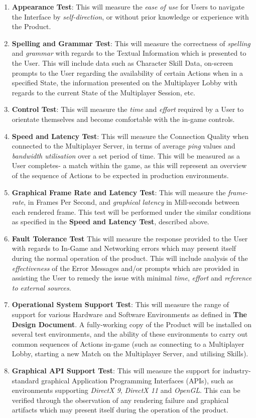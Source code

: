 \documentclass{article}
\begin{document}
\begin{enumerate}
    \item \textbf{Appearance Test}:  This will measure the \emph{ease of use} for Users to navigate the Interface by \emph{self-direction}, or without prior knowledge or experience with the Product.
    \item \textbf{Spelling and Grammar Test}:  This will measure the correctness of \emph{spelling} and \emph{grammar} with regards to the Textual Information which is presented to the User. This will include data such as Character Skill Data, on-screen prompts to the User regarding the availability of certain Actions when in a specified State, the information presented on the Multiplayer Lobby with regards to the current State of the Multiplayer Session, etc.
    \item \textbf{Control Test}: This will measure the \emph{time} and \emph{effort} required by a User to orientate themselves and become comfortable with the in-game controls.
    \item \textbf{Speed and Latency Test}: This will measure the Connection Quality when connected to the Multiplayer Server, in terms of average \emph{ping} values and \emph{bandwidth utilisation} over a set period of time. This will be measured as a User completes- a match within the game, as this will represent an overview of the sequence of Actions to be expected in production environments.
    \item \textbf{Graphical Frame Rate and Latency Test}: This will measure the \emph{frame-rate}, in Frames Per Second, and \emph{graphical latency} in Mill-seconds between each rendered frame. This test will be performed under the similar conditions as specified in the \textbf{Speed and Latency Test}, described above.
    \item \textbf{Fault Tolerance Test} This will measure the response provided to the User with regards to In-Game and Networking errors which may present itself during the normal operation of the product. This will include analysis of the \emph{effectiveness} of the Error Messages and/or prompts which are provided in assisting the User to remedy the issue with minimal \emph{time}, \emph{effort} and \emph{reference to external sources}.
    \item \textbf{Operational System Support Test}:  This will measure the range of support for various Hardware and Software Environments as defined in \textbf{The Design Document}. A fully-working copy of the Product will be installed on several test environments, and the ability of these environments to carry out common sequences of Actions in-game (such as connecting to a Multiplayer Lobby, starting a new Match on the Multiplayer Server, and utilising Skills).
    
    \item \textbf{Graphical API Support Test}: This will measure the support for industry-standard graphical Application Programming Interfaces (APIs), such as environments supporting \emph{DirectX 9}, \emph{DirectX 11} and \emph{OpenGL}. This can be verified through the observation of any rendering failure and graphical artifacts which may present itself during the operation of the product.
    \end{enumerate}
    
\end{document}
